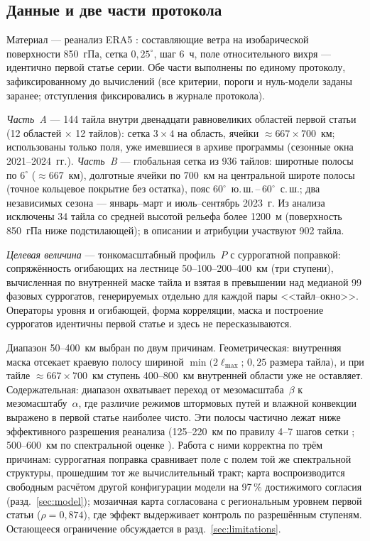 \documentclass[11pt,a4paper]{article}
\begin{document}
\subsection{Данные и две части протокола}

Материал --- реанализ ERA5 \cite{Hersbach2020,Soci2024}: составляющие ветра на изобарической поверхности 850~гПа, сетка $0{,}25^\circ$, шаг 6~ч, поле относительного вихря --- идентично первой статье серии. Обе части выполнены по единому протоколу, зафиксированному до вычислений (все критерии, пороги и нуль-модели заданы заранее; отступления фиксировались в журнале протокола).

\emph{Часть~A} --- 144 тайла внутри двенадцати равновеликих областей первой статьи (12 областей $\times$ 12 тайлов): сетка $3\times4$ на область, ячейки $\approx667\times700$~км; использованы только поля, уже имевшиеся в архиве программы (сезонные окна 2021--2024~гг.). \emph{Часть~B} --- глобальная сетка из 936 тайлов: широтные полосы по $6^\circ$ ($\approx$667~км), долготные ячейки по 700~км на центральной широте полосы (точное кольцевое покрытие без остатка), пояс $60^\circ$~ю.\,ш.\,--\,$60^\circ$~с.\,ш.; два независимых сезона --- январь--март и июль--сентябрь 2023~г. Из анализа исключены 34 тайла со средней высотой рельефа более 1200~м (поверхность 850~гПа ниже подстилающей); в описании и атрибуции участвуют 902 тайла.

\emph{Целевая величина} --- тонкомасштабный профиль~$P$ с суррогатной поправкой: сопряжённость огибающих на лестнице 50--100--200--400~км (три ступени), вычисленная по внутренней маске тайла и взятая в превышении над медианой 99 фазовых суррогатов, генерируемых отдельно для каждой пары <<тайл--окно>>. Операторы уровня и огибающей, форма корреляции, маска и построение суррогатов идентичны первой статье и здесь не пересказываются.

Диапазон 50--400~км выбран по двум причинам. Геометрическая: внутренняя маска отсекает краевую полосу шириной $\min(2\ell_{\max};\,0{,}25$ размера тайла$)$, и при тайле $\approx667\times700$~км ступень 400--800~км внутренней области уже не оставляет. Содержательная: диапазон охватывает переход от мезомасштаба~$\beta$ к мезомасштабу~$\alpha$, где различие режимов штормовых путей и влажной конвекции выражено в первой статье наиболее чисто. Эти полосы частично лежат ниже эффективного разрешения реанализа (125--220~км по правилу 4--7 шагов сетки \cite{Skamarock2004}; 500--600~км по спектральной оценке \cite{Bolgiani2022}). Работа с ними корректна по трём причинам: суррогатная поправка сравнивает поле с полем той же спектральной структуры, прошедшим тот же вычислительный тракт; карта воспроизводится свободным расчётом другой конфигурации модели на 97\,\% достижимого согласия (разд.~\ref{sec:model}); мозаичная карта согласована с региональным уровнем первой статьи ($\rho=0{,}874$), где эффект выдерживает контроль по разрешённым ступеням. Остающееся ограничение обсуждается в разд.~\ref{sec:limitations}.
\end{document}
